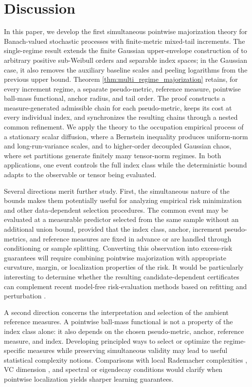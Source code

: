 \documentclass[11pt]{article}
\begin{document}
\section{Discussion}\label{sec:discussion}
In this paper, we develop the first simultaneous pointwise majorization
theory for Banach-valued stochastic processes with 
finite-metric mixed-tail increments. The single-regime result extends
the finite Gaussian upper-envelope construction of \citet{xu2026} to
arbitrary positive sub-Weibull orders and separable index spaces; in the
Gaussian case, it also removes the auxiliary baseline scales and peeling
logarithms from the previous upper bound. Theorem \ref{thm:multi_regime_majorization}
retains, for every increment regime, a separate pseudo-metric, reference
measure, pointwise ball-mass functional, anchor radius, and tail order.
The proof constructs a measure-generated admissible chain for each
pseudo-metric, keeps its cost at every individual index, and synchronizes
the resulting chains through a nested common refinement. We apply the
theory to the occupation empirical process of a stationary scalar
diffusion, where a Bernstein inequality produces uniform-norm and
long-run-variance scales, and to higher-order decoupled Gaussian chaos,
where set partitions generate finitely many tensor-norm regimes. In both
applications, one event controls the full index class while the
deterministic bound adapts to the observable or tensor being evaluated.

Several directions merit further study. First, the simultaneous nature
of the bounds makes them potentially useful for analyzing empirical risk
minimization and other data-dependent selection procedures. The common
event may be evaluated at a measurable predictor selected from the same
sample without an additional union bound, provided that the index class,
anchor, increment pseudo-metrics, and reference measures are fixed in
advance or are handled through conditioning or sample splitting.
Converting this observation into excess-risk guarantees will require
combining pointwise majorization with appropriate curvature, margin, or
localization properties of the risk. It would be particularly
interesting to determine whether the resulting candidate-dependent
certificates can complement recent model-free risk-evaluation methods
based on refitting and perturbation
\citep{wainwright2025wild,hu2025perturbing,
hu2026interleaved,ni2026upper}.

A second direction concerns the interpretation and selection of the
ambient reference measures. A pointwise ball-mass functional is not a
property of the index class alone: it also depends on the chosen
pseudo-metric, anchor, reference measure, and index. Developing
principled ways to select or optimize the regime-specific measures while
preserving simultaneous validity may lead to useful statistical
complexity notions. Comparisons with local Rademacher complexities
\citep{bartlett2005local,koltchinskii2006local}, VC dimension
\citep{vapnik2013nature}, and spectral or eigendecay conditions
\citep{hu2025contextual} would clarify when pointwise localization yields
sharper learning guarantees.
\end{document}
